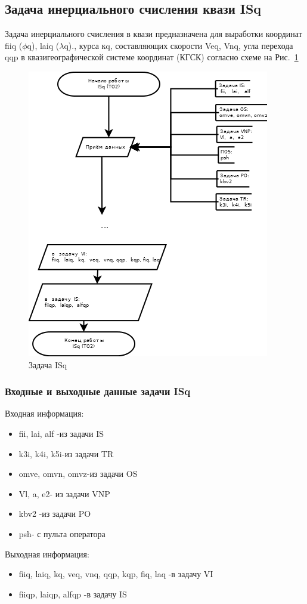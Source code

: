 \subsection{Задача инерциального счисления квази ISq}
Задача инерциального счисления  в квази  предназначена для выработки  координат  fiiq ($\phi$q),  laiq ($\lambda$q).,  
курса  кq,  составляющих  скорости  Veq,  Vnq,  угла   перехода  qqp  в квазигеографической системе  координат (КГСК) согласно схеме на Рис.~\ref{fig:ISq}
\begin{figure}[H]
    \centering
    \includegraphics[width=0.75\linewidth]{images/ISq_simple.png}
    \caption{Задача ISq}
    \label{fig:ISq}
\end{figure}
\subsubsection{Входные и выходные данные задачи ISq}
Входная информация:
\begin{itemize}
\item fii,   lai,   alf  -из задачи  IS
\item k3i,  k4i,  k5i-из задачи  TR
\item omve, omvn, omvz-из задачи  OS
\item Vl,  a,  e2- из задачи  VNP
\item kbv2 -из задачи  PO
\item psh- с пульта оператора
\end{itemize}
Выходная информация:
\begin{itemize}
    \item fiiq,  laiq,  kq,  veq,  vnq, qqp,  kqp, fiq, laq  -в  задачу  VI
    \item fiiqp,  laiqp,  alfqp  -в  задачу  IS
\end{itemize}

